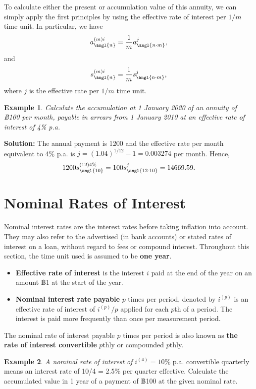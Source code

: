 \documentclass[
]{book}
\theoremstyle{definition}
\theoremstyle{definition}
\newtheorem{example}{Example}[chapter]
\theoremstyle{definition}
\theoremstyle{definition}
\theoremstyle{remark}
\begin{document}
To calculate either the present or accumulation value of this annuity,
we can simply apply the first principles by using the effective rate of
interest per \(1/m\) time unit. In particular, we have
\[a^{(m)i}_\angl{n}   = \frac{1}{m}  a^j_\angl{n\cdot m},\] and
\[s^{(m)i}_\angl{n}   = \frac{1}{m}  s^j_\angl{n\cdot m},\] where \(j\) is
the effective rate per \(1/m\) time unit.

\begin{example}
\emph{Calculate the accumulation at 1 January 2020 of an annuity of ฿100 per
month, payable in arrears from 1 January 2010 at an effective rate of
interest of 4\% p.a.}
\end{example}

\textbf{Solution:} The annual payment is 1200 and the effective rate per
month equivalent to 4\% p.a. is \(j = (1.04)^{1/12} - 1 = 0.003274\) per
month. Hence,
\[1200 s^{(12)4\%}_\angl{10}   = 100  s^j_\angl{12\cdot 10} = 14669.59.\]

\hypertarget{nominal-rates-of-interest}{%
\section{Nominal Rates of Interest}\label{nominal-rates-of-interest}}

Nominal interest rates are the interest rates before taking inflation
into account. They may also refer to the advertised (in bank accounts)
or stated rates of interest on a loan, without regard to fees or
compound interest. Throughout this section, the time unit used is
assumed to be \textbf{one year}.

\begin{itemize}
\item
  \textbf{Effective rate of interest} is the interest \(i\) paid at the end
  of the year on an amount ฿1 at the start of the year.
\item
  \textbf{Nominal interest rate payable} \(p\) times per period, denoted by
  \(i^{(p)}\) is an effective rate of interest of \(i^{(p)}/p\) applied
  for each \(p\)th of a period. The interest is paid more frequently
  than once per measurement period.
\end{itemize}

The nominal rate of interest payable \(p\) times per period is also known
as \textbf{the rate of interest convertible} \(p\)thly or compounded \(p\)thly.

\begin{example}
\emph{A nominal rate of interest of} \(i^{(4)} = 10\%\) p.a. convertible
quarterly means an interest rate of 10/4 = 2.5\% per quarter effective.
Calculate the accumulated value in 1 year of a payment of ฿100 at the
given nominal rate.
\end{example}
\end{document}
